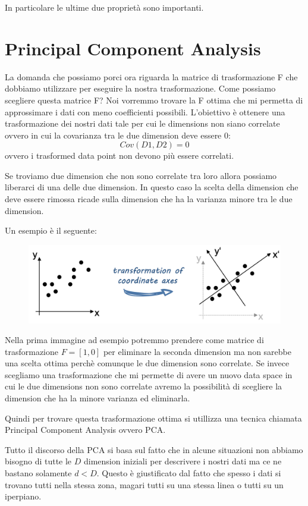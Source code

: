 \documentclass[14pt]{extreport}
\begin{document}
In particolare le ultime due proprietà sono importanti.

\section{Principal Component Analysis}

La domanda che possiamo porci ora riguarda la matrice di trasformazione F che dobbiamo utilizzare per eseguire la nostra trasformazione.
Come possiamo scegliere questa matrice F? Noi vorremmo trovare la F ottima che mi permetta di approssimare i dati con meno coefficienti 
possibili.
L'obiettivo è ottenere una trasformazione dei nostri dati tale per cui le dimensions non siano correlate ovvero in cui la covarianza tra le
due dimension deve essere 0: 
$$Cov(D1,D2) = 0$$
ovvero i trasformed data point non devono più essere correlati.

Se troviamo due dimension che non sono correlate tra loro allora possiamo liberarci di una delle due dimension. In questo
caso la scelta della dimension che deve essere rimossa ricade sulla dimension che ha la varianza minore tra le due dimension.

Un esempio è il seguente:

\begin{figure}[H]
\centering
\includegraphics[width=0.7\linewidth]{438.jpeg}
\end{figure}

Nella prima immagine ad esempio potremmo prendere come matrice di trasformazione $F = [1,0]$ per eliminare la seconda dimension
ma non sarebbe una scelta ottima perchè comunque le due dimension sono correlate. Se invece scegliamo una trasformazione che mi
permette di avere un nuovo data space in cui le due dimensions non sono correlate avremo la possibilità di scegliere la dimension che ha 
la minore varianza ed eliminarla.

Quindi per trovare questa trasformazione ottima si utillizza una tecnica chiamata Principal Component Analysis ovvero PCA.

Tutto il discorso della PCA si basa sul fatto che in alcune situazioni non abbiamo bisogno di tutte le $D$ dimension iniziali per 
descrivere i nostri dati ma ce ne bastano solamente $d<D$. Questo è giustificato dal fatto che spesso i dati si trovano tutti nella 
stessa zona, magari tutti su una stessa linea o tutti su un iperpiano.
\end{document}
